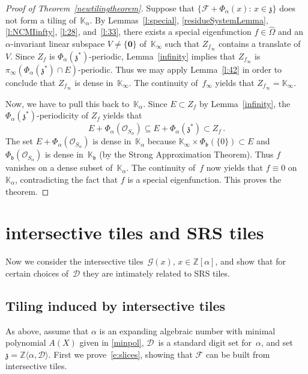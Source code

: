 \documentclass[12pt]{amsart}
\theoremstyle{definition}
\theoremstyle{remark}
\numberwithin{equation}{section}
\begin{document}
\begin{proof}[Proof of Theorem~\ref{newtilingtheorem}]
Suppose that $\{\mathcal{F} + \Phi_\alpha(x):\, x \in \mathfrak{z}\}$ does not form a tiling of~$\mathbb{K}_\alpha$.
By Lemmas~\ref{l:special}, \ref{residueSystemLemma}, \ref{l:NCMIinfty}, \ref{l:28}, and~\ref{l:33}, there exists a special eigenfunction $f \in \widehat\Omega$ and an $\alpha$-invariant linear subspace $V \neq \{\mathbf{0}\}$ of~$\mathbb{K}_\infty$ such that $Z_{f_\infty}$ contains a translate of~$V$.
Since $Z_f$ is $\Phi_\alpha(\mathfrak{z}^*)$-periodic, Lemma~\ref{infinity} implies that $Z_{f_\infty}$ is $\pi_\infty(\Phi_\alpha(\mathfrak{z}^*) \cap E)$-periodic.
Thus we may apply Lemma~\ref{l:42} in order to conclude that $Z_{f_\infty}$ is dense in~$\mathbb{K}_\infty$.
The continuity of~$f_\infty$ yields that $Z_{f_\infty} = \mathbb{K}_\infty$.

Now, we have to pull this back to~$\mathbb{K}_\alpha$.
Since $E \subset Z_f$ by Lemma~\ref{infinity}, the $\Phi_\alpha(\mathfrak{z}^*)$-periodicity of $Z_f$ yields that
\[
E + \Phi_\alpha(\mathcal{O}_{S_\alpha}) \subseteq E + \Phi_\alpha(\mathfrak{z}^*) \subset Z_f\,.
\]
The set $E + \Phi_\alpha(\mathcal{O}_{S_\alpha})$ is dense in~$\mathbb{K}_\alpha$ because $\mathbb{K}_\infty \times \Phi_\mathfrak{b}(\{0\}) \subset E$ and $\Phi_\mathfrak{b}(\mathcal{O}_{S_\alpha})$ is dense in~$\mathbb{K}_\mathfrak{b}$ (by the Strong Approximation Theorem).
Thus $f$ vanishes on a dense subset of~$\mathbb{K}_\alpha$.
The continuity of~$f$ now yields that $f \equiv 0$ on~$\mathbb{K}_\alpha$, contradicting the fact that $f$ is a special eigenfunction.
This proves the theorem.
\end{proof}

\section{intersective tiles and SRS tiles} \label{sec:relat-betw-tiles}

Now we consider the intersective tiles~$\mathcal{G}(x)$, $x \in \mathbb{Z}[\alpha]$, and show that for certain choices of~$\mathcal{D}$ they are intimately related to SRS tiles.

\subsection*{Tiling induced by intersective tiles}
As above, assume that $\alpha$ is an expanding algebraic number with minimal polynomial $A(X)$ given in \eqref{minpol}, $\mathcal{D}$~is a standard digit set for~$\alpha$, and set $\mathfrak{z} = \mathbb{Z}\langle \alpha, \mathcal{D}\rangle$.
First we prove~\eqref{e:slices}, showing that $\mathcal{F}$ can be built from intersective tiles.
\end{document}
